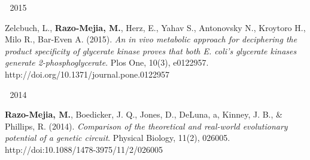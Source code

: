 \begin{cventries}
\cventry
    {$\;$}
    {2015}
    {$\;$}
    {$\;$}
    {
      \begin{cvitems}
        \item {
        \begin{flushleft}
           Zelcbuch, L., \textbf{Razo-Mejia, M.}, Herz, E., Yahav S.,
           Antonovsky N., Kroytoro H., Milo R., Bar-Even A. (2015). \textit{An
           in vivo metabolic approach for deciphering the product specificity
           of glycerate kinase proves that both E. coli's glycerate kinases
           generate 2-phosphoglycerate}. Plos One, 10(3), e0122957.\linebreak
           http://doi.org/10.1371/journal.pone.0122957
        \end{flushleft}
        }
      \end{cvitems}
    }
\cventry
    {$\;$}
    {2014}
    {$\;$}
    {$\;$}
    {
      \begin{cvitems}
        \item {
        \begin{flushleft}
           \textbf{Razo-Mejia, M.}, Boedicker, J. Q., Jones, D., DeLuna, a,
           Kinney, J. B., \& Phillips, R. (2014). \textit{Comparison of the
           theoretical and real-world evolutionary potential of a genetic
           circuit}. Physical Biology, 11(2), 026005.\linebreak
           http://doi:10.1088/1478-3975/11/2/026005
        \end{flushleft}
        }
      \end{cvitems}
    }


\end{cventries}
